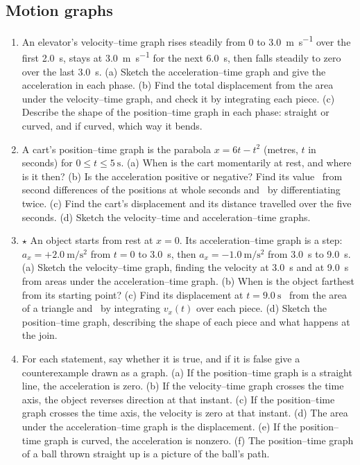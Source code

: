 \subsection*{Motion graphs}
\begin{enumerate}[label=\textbf{\thechapter.\arabic*},resume=exercises,leftmargin=*]
  \item An elevator's velocity--time graph rises steadily from $0$ to \SI{3.0}{\metre\per\second} over the first \SI{2.0}{\second}, stays at \SI{3.0}{\metre\per\second} for the next \SI{6.0}{\second}, then falls steadily to zero over the last \SI{3.0}{\second}. (a) Sketch the acceleration--time graph and give the acceleration in each phase. (b) Find the total displacement from the area under the velocity--time graph, and check it by integrating each piece. (c) Describe the shape of the position--time graph in each phase: straight or curved, and if curved, which way it bends.\label{ex:elevatorgraph}
  \item A cart's position--time graph is the parabola $x = 6t - t^2$ (metres, $t$ in seconds) for $0 \le t \le \SI{5}{\second}$. (a) When is the cart momentarily at rest, and where is it then? (b) Is the acceleration positive or negative? Find its value \elemtag\ from second differences of the positions at whole seconds and \calctag\ by differentiating twice. (c) Find the cart's displacement and its distance travelled over the five seconds. (d) Sketch the velocity--time and acceleration--time graphs.\label{ex:parabolagraph}
  \item $\star$ An object starts from rest at $x = 0$. Its acceleration--time graph is a step: $a_x = +\SI{2.0}{\metre\per\second\squared}$ from $t = 0$ to \SI{3.0}{\second}, then $a_x = \SI{-1.0}{\metre\per\second\squared}$ from \SI{3.0}{\second} to \SI{9.0}{\second}. (a) Sketch the velocity--time graph, finding the velocity at \SI{3.0}{\second} and at \SI{9.0}{\second} from areas under the acceleration--time graph. (b) When is the object farthest from its starting point? (c) Find its displacement at $t = \SI{9.0}{\second}$ \elemtag\ from the area of a triangle and \calctag\ by integrating $v_x(t)$ over each piece. (d) Sketch the position--time graph, describing the shape of each piece and what happens at the join.\label{ex:stepaccel}
  \item For each statement, say whether it is true, and if it is false give a counterexample drawn as a graph. (a) If the position--time graph is a straight line, the acceleration is zero. (b) If the velocity--time graph crosses the time axis, the object reverses direction at that instant. (c) If the position--time graph crosses the time axis, the velocity is zero at that instant. (d) The area under the acceleration--time graph is the displacement. (e) If the position--time graph is curved, the acceleration is nonzero. (f) The position--time graph of a ball thrown straight up is a picture of the ball's path.\label{ex:graphtruth}
\end{enumerate}

